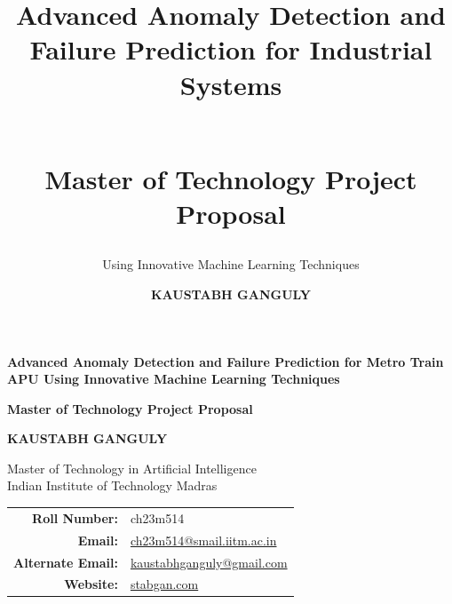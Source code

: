 \documentclass[11pt,a4paper]{article}
\title{\Huge\textbf{Advanced Anomaly Detection and Failure Prediction for Industrial Systems}\\ \vspace{0.5cm} \subtitle{Using Innovative Machine Learning Techniques}\\ \vspace{1cm} \LARGE Master of Technology Project Proposal}
\author{\textbf{KAUSTABH GANGULY}}
\date{}
\begin{document}
\begin{titlepage}
    \begin{center}
        \vspace*{2cm}
        
        {\Huge\textbf{Advanced Anomaly Detection and Failure Prediction for Metro Train APU Using Innovative Machine Learning Techniques}}

        \vspace{1cm}
        {\LARGE\textbf{Master of Technology Project Proposal}}

        \vspace{2cm}
        
        \textbf{KAUSTABH GANGULY}

        \vspace{0.5cm}
        
        \Large
        Master of Technology in Artificial Intelligence \\
        Indian Institute of Technology Madras

        \vspace{2cm}

        \begin{tabular}{rl}
            \textbf{Roll Number:} & ch23m514 \\
            \textbf{Email:} & \href{mailto:ch23m514@smail.iitm.ac.in}{ch23m514@smail.iitm.ac.in} \\
            \textbf{Alternate Email:} & \href{mailto:kaustabhganguly@gmail.com}{kaustabhganguly@gmail.com} \\
            \textbf{Website:} & \href{http://stabgan.com}{stabgan.com} \\
        \end{tabular}
        
        \vfill
        
        
        \vspace{1cm}

    \end{center}
\end{titlepage}
\end{document}
